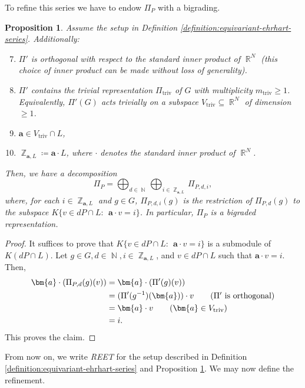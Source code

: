 \documentclass[a4paper,12pt]{amsart}
\theoremstyle{plain}
\newtheorem{proposition}[theorem]{Proposition}
\theoremstyle{definition}
\theoremstyle{remark}
\DeclareMathOperator{\NN}{\mathbb{N}}
\DeclareMathOperator{\ZZ}{\mathbb{Z}}
\DeclareMathOperator{\RR}{\mathbb{R}}
\DeclareMathOperator{\triv}{triv}
\begin{document}
To refine this series we have to endow $\Pi_P$ with a bigrading.

\begin{proposition}\label{proposition:rho-prime-p-is-bigraded-representation}
    Assume the setup in Definition \ref{definition:equivariant-ehrhart-series}. Additionally:
    \begin{enumerate}
    \setcounter{enumi}{6}
        \item $\Pi'$ is orthogonal with respect to the standard inner product of $\RR^N$ (this choice of inner product can be made without loss of generality).
        \item $\Pi'$ contains the trivial representation $\Pi_{\triv}$ of $G$ with multiplicity $m_{\triv} \geq 1$. Equivalently, $\Pi'(G)$ acts trivially on a subspace $V_{\triv} \subseteq \RR^N$ of dimension $\geq 1$.
        \item $\bm{a} \in V_{\triv} \cap L$,
        \item $\ZZ_{\bm{a}, L} \coloneq \bm{a} \cdot L$, where $\cdot$ denotes the standard inner product of $\RR^N$.
    \end{enumerate}
    Then, we have a decomposition
    \[
    \Pi_P = \bigoplus_{d \in \NN} \bigoplus_{i \in \ZZ_{\bm{a}, L}} \Pi_{P, d, i},
    \]
    where, for each $i \in \ZZ_{\bm{a}, L}$ and $g \in G$, $\Pi_{P, d, i}(g)$ is the restriction of $\Pi_{P, d}(g)$ to the subspace $K \{v \in dP \cap L: ~~ \bm{a} \cdot v = i\}$.
   In particular, $\Pi_P$ is a \emph{bigraded representation}.
\end{proposition}
\begin{proof}
    It suffices to prove that $K \{v \in dP \cap L: ~~ \bm{a} \cdot v = i\}$ is a submodule of $K(dP \cap L)$. Let $g \in G, d \in \NN, i \in \ZZ_{\bm{a}, L}$, and $v \in dP \cap L$ such that $\bm{a} \cdot v = i$. Then,
    \begin{align*}
    \bm{a} \cdot (\Pi_{P, d}(g)(v)) 
        &=\bm{a} \cdot (\Pi'(g)(v)) \\
        &=(\Pi'(g^{-1})(\bm{a})) \cdot v \tag{$\Pi'$ is orthogonal} \\
        &=\bm{a} \cdot v \tag{$\bm{a} \in V_{\triv}$} \\
        &=i.
    \end{align*}
    This proves the claim.
\end{proof}
From now on, we write \emph{REET} for the setup described in Definition \ref{definition:equivariant-ehrhart-series} and Proposition \ref{proposition:rho-prime-p-is-bigraded-representation}. We may now define the refinement.
\end{document}
